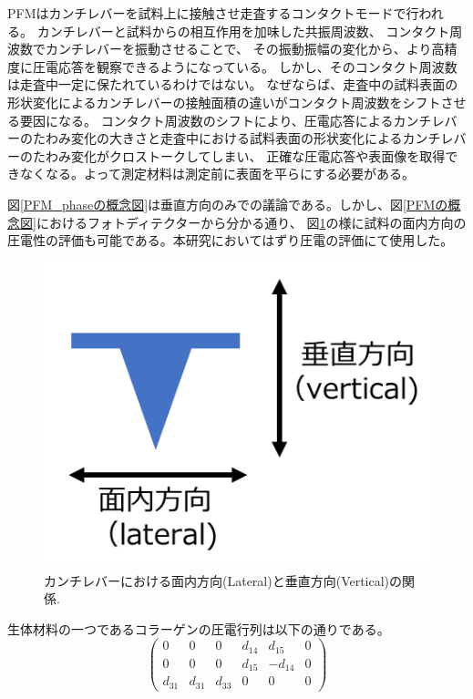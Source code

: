 \documentclass[dvipdfmx,12pt,a4paper]{jreport}
\begin{document}
				PFMはカンチレバーを試料上に接触させ走査するコンタクトモードで行われる。
				カンチレバーと試料からの相互作用を加味した共振周波数、
				コンタクト周波数でカンチレバーを振動させることで、
				その振動振幅の変化から、より高精度に圧電応答を観察できるようになっている。
				しかし、そのコンタクト周波数は走査中一定に保たれているわけではない。
				なぜならば、走査中の試料表面の形状変化によるカンチレバーの接触面積の違いがコンタクト周波数をシフトさせる要因になる。
				コンタクト周波数のシフトにより、圧電応答によるカンチレバーのたわみ変化の大きさと走査中における試料表面の形状変化によるカンチレバーのたわみ変化がクロストークしてしまい、
				正確な圧電応答や表面像を取得できなくなる。よって測定材料は測定前に表面を平らにする必要がある。
				
				図\ref{PFM_phaseの概念図}は垂直方向のみでの議論である。しかし、図\ref{PFMの概念図}におけるフォトディテクターから分かる通り、
				図\ref{面内と垂直の概念図}の様に試料の面内方向の圧電性の評価も可能である。本研究においてはずり圧電の評価にて使用した。
				\begin{figure}[h]
					\centering
					\includegraphics[scale=0.7]{lateral_vertical.png}
					\caption{カンチレバーにおける面内方向(Lateral)と垂直方向(Vertical)の関係.}
					\label{面内と垂直の概念図}
				\end{figure}
				\newpage
				生体材料の一つであるコラーゲンの圧電行列は以下の通りである。
				\begin{equation}
					\left(
				\begin{array}{cccccc}
					0&0&0&d_{14}&d_{15}&0 \\
					0&0&0&d_{15}&-d_{14}&0 \\
					d_{31}&d_{31}&d_{33}&0&0&0
				\end{array}\right)
			\end{equation}
\end{document}
